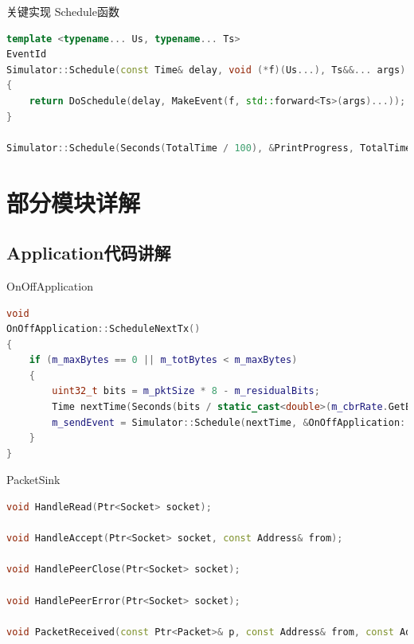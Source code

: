 \documentclass{beamer}
\begin{document}
\begin{frame}[fragile]{关键实现}
	Schedule函数
	\begin{lstlisting}[language=C++]
template <typename... Us, typename... Ts>
EventId
Simulator::Schedule(const Time& delay, void (*f)(Us...), Ts&&... args)
{
    return DoSchedule(delay, MakeEvent(f, std::forward<Ts>(args)...));
}

Simulator::Schedule(Seconds(TotalTime / 100), &PrintProgress, TotalTime);
\end{lstlisting}
\end{frame}


\section{部分模块详解}

\subsection{Application代码讲解}
\begin{frame}[fragile]{OnOffApplication}
	\begin{lstlisting}[language=C++]
void
OnOffApplication::ScheduleNextTx()
{
    if (m_maxBytes == 0 || m_totBytes < m_maxBytes)
    {
        uint32_t bits = m_pktSize * 8 - m_residualBits;
        Time nextTime(Seconds(bits / static_cast<double>(m_cbrRate.GetBitRate())));
        m_sendEvent = Simulator::Schedule(nextTime, &OnOffApplication::SendPacket, this);
    }
}
\end{lstlisting}
\end{frame}

\begin{frame}[fragile]{PacketSink}
	\begin{lstlisting}[language=C++]
void HandleRead(Ptr<Socket> socket);

void HandleAccept(Ptr<Socket> socket, const Address& from);

void HandlePeerClose(Ptr<Socket> socket);

void HandlePeerError(Ptr<Socket> socket);

void PacketReceived(const Ptr<Packet>& p, const Address& from, const Address& localAddress);
\end{lstlisting}
\end{frame}
\end{document}
